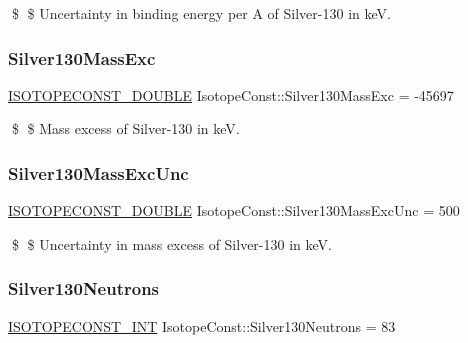 \$ \$ Uncertainty in binding energy per A of Silver-\/130 in keV. \mbox{\label{group___isotope_const-_silver-_ag130_ga441cc46505f3f221349f8935ce81633b}} 
\subsubsection{\texorpdfstring{Silver130\+Mass\+Exc}{Silver130MassExc}}
{\footnotesize\ttfamily \mbox{\hyperlink{group___isotope_const-_macros_ga8f45a7272ce02c0b4c65c44636ed719a}{I\+S\+O\+T\+O\+P\+E\+C\+O\+N\+S\+T\+\_\+\+D\+O\+U\+B\+LE}} Isotope\+Const\+::\+Silver130\+Mass\+Exc = -\/45697}

\$ \$ Mass excess of Silver-\/130 in keV. \mbox{\label{group___isotope_const-_silver-_ag130_ga9243ea149d2e2181426bb71d0a160ebd}} 
\subsubsection{\texorpdfstring{Silver130\+Mass\+Exc\+Unc}{Silver130MassExcUnc}}
{\footnotesize\ttfamily \mbox{\hyperlink{group___isotope_const-_macros_ga8f45a7272ce02c0b4c65c44636ed719a}{I\+S\+O\+T\+O\+P\+E\+C\+O\+N\+S\+T\+\_\+\+D\+O\+U\+B\+LE}} Isotope\+Const\+::\+Silver130\+Mass\+Exc\+Unc = 500}

\$ \$ Uncertainty in mass excess of Silver-\/130 in keV. \mbox{\label{group___isotope_const-_silver-_ag130_ga900c863d04dded4398e83f89e2ee9bca}} 
\subsubsection{\texorpdfstring{Silver130\+Neutrons}{Silver130Neutrons}}
{\footnotesize\ttfamily \mbox{\hyperlink{group___isotope_const-_macros_ga5f18360b3e99483a35c32d789e62621c}{I\+S\+O\+T\+O\+P\+E\+C\+O\+N\+S\+T\+\_\+\+I\+NT}} Isotope\+Const\+::\+Silver130\+Neutrons = 83}

